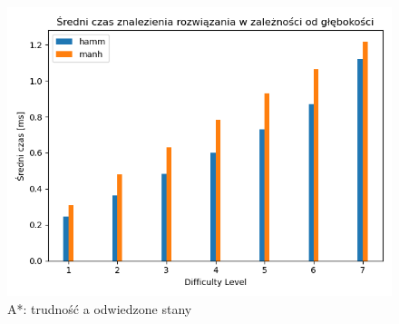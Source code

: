 \documentclass{classrep}
\begin{document}
\begin{figure}[p] \centering
 \includegraphics[width=0.9\linewidth]{./pic/astr_time_vs_diff.png}
 \caption{A*: trudność a odwiedzone stany}
\end{figure}
\end{document}
